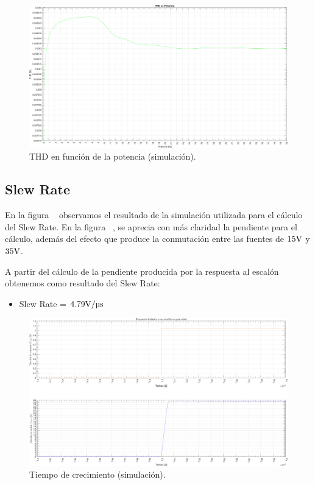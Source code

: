\begin{figure}[H]
    \centering
    \includegraphics[angle=90,scale=0.47]{./img/simulaciones/THD/THD_vs_power_sim.png}
    \caption{THD en función de la potencia (simulación).}
    \label{fig:THD_vs_power_sim}
\end{figure}

\subsection{Slew Rate}

\par En la figura ~ observamos el resultado de la simulación utilizada para el cálculo del Slew Rate. En la figura  ~, se aprecia con más claridad la pendiente para el cálculo, además del efecto que produce la conmutación entre las fuentes de $15 \si[per-mode=symbol]{\volt}$ y $35 \si[per-mode=symbol]{\volt}$.

\par A partir del cálculo de la pendiente producida por la respuesta al escalón obtenemos como resultado del Slew Rate:

\begin{itemize}
    \item Slew Rate = $4.79 \si[per-mode=symbol]{\volt\per\micro\second}$
\end{itemize}

\vfill

\clearpage

\begin{figure}[H]
    \centering
    \includegraphics[angle=90,scale=0.45]{./img/simulaciones/Slew_Rate/Slew_Rate.png}
    \caption{Tiempo de crecimiento (simulación).}
    \label{fig:Slew_Rate}
\end{figure}

